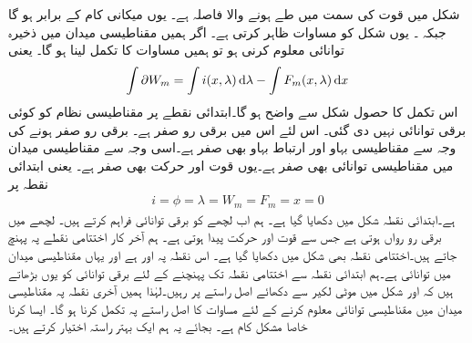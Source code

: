 شکل   میں قوت   کی سمت میں طے ہونے والا فاصلہ  ہے۔ یوں  میکانی کام  کے برابر ہو گا جبکہ  ۔ یوں شکل    کو مساوات   ظاہر کرتی ہے۔ اگر ہمیں مقناطیسی میدان میں ذخیرہ توانائی  معلوم کرنی ہو تو ہمیں مساوات   کا تکمل  لینا ہو گا۔ یعنی
\begin{align}\label{مساوات_تبادلہ_توانائی_تکمل}
\int \partial W_m = \int i(x,\lambda) \dif \lambda-\int F_m(x,\lambda) \dif x
\end{align}
اس تکمل کا حصول شکل    سے واضح ہو گا۔ابتدائی نقطے پر مقناطیسی نظام کو کوئی برقی توانائی نہیں دی گئی۔ اس لئے اس میں  برقی رو صفر ہے۔ برقی رو صفر ہونے کی وجہ سے  مقناطیسی بہاو اور  ارتباط بہاو بھی صفر ہے۔اسی وجہ سے مقناطیسی میدان میں مقناطیسی توانائی بھی صفر ہے۔یوں  قوت اور حرکت بھی صفر ہے۔ یعنی ابتدائی نقطہ پر
\begin{align*}
i=\phi=\lambda=W_m=F_m=x=0
\end{align*}
ہے۔ابتدائی نقطہ شکل   میں دکھایا گیا ہے۔ ہم اب لچھے کو برقی توانائی فراہم کرتے ہیں۔ لچھے میں برقی رو رواں ہوتی ہے جس سے قوت اور حرکت پیدا ہوتی ہے۔ ہم آخر کار  اختتامی نقطے پہ پہنچ جاتے ہیں۔اختتامی نقطہ بھی شکل میں دکھایا گیا ہے۔ اس نقطہ پہ  اور  ہے اور یہاں مقناطیسی میدان میں توانائی  ہے۔ہم ابتدائی نقطہ  سے اختتامی نقطہ  تک پہنچنے کے لئے  برقی توانائی کو یوں بڑھاتے ہیں کہ  اور   شکل   میں موٹی لکیر سے دکھائے اصل راستے پر رہیں۔لہٰذا ہمیں آخری نقطہ پہ مقناطیسی میدان میں مقناطیسی توانائی  معلوم کرنے کے لئے مساوات   کا اصل راستے پہ تکمل کرنا ہو گا۔ ایسا کرنا خاصا مشکل کام ہے۔ بجائے یہ ہم ایک بہتر راستہ اختیار کرتے ہیں۔
